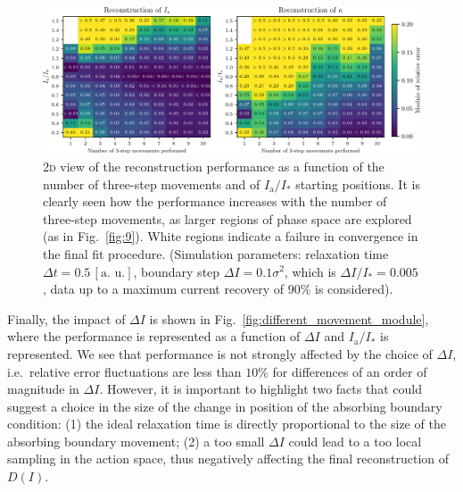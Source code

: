 {\begin{figure}[t]
    \centering
    \includegraphics[width=\textwidth]{4_probing_the_diffusive_behavior/figs/final/MULTI_different_samples.pdf}
    \caption{2\textsc{d} view of the reconstruction performance as a function of the number of three-step movements and of $I_\mathrm{a}/I_\ast$ starting positions. It is clearly seen how the performance increases with the number of three-step movements, as larger regions of phase space are explored (as in Fig.~\ref{fig:9}). White regions indicate a failure in convergence in the final fit procedure. (Simulation parameters: relaxation time $\Delta t=0.5 \, [\text{a. u.}]$, boundary step $\Delta I=0.1 \sigma^2$, which is $\Delta I / I_\ast = 0.005$, data up to a maximum current recovery of $90\%$ is considered).}
    \label{fig:different_nsamples}
\end{figure}

Finally, the impact of $\Delta I$ is shown in Fig.~\ref{fig:different_movement_module}, where the performance is represented as a function of $\Delta I$ and $I_\mathrm{a}/I_\ast$ is represented.  We see that performance is not strongly affected by the choice of $\Delta I$, i.e.\ relative error fluctuations are less than $10\%$ for differences of an order of magnitude in $\Delta I$. However, it is important to highlight two facts that could suggest a choice in the size of the change in position of the absorbing boundary condition: (1) the ideal relaxation time is directly proportional to the size of the absorbing boundary movement; (2) a too small $\Delta I$ could lead to a too local sampling in the action space, thus negatively affecting the final reconstruction of $D(I)$. 

}
